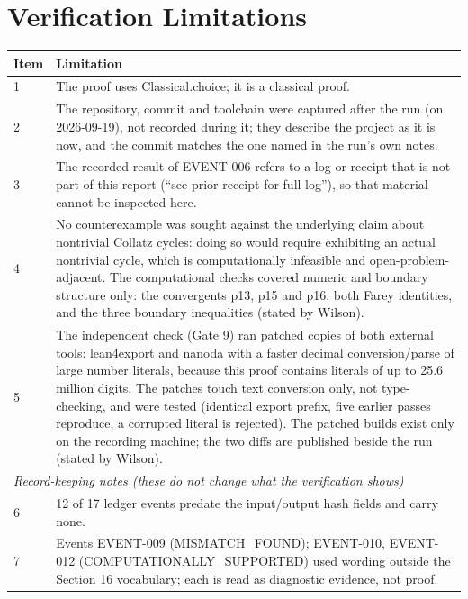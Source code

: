 \documentclass[11pt]{article}
\begin{document}
\section{Verification Limitations}
\begin{longtable}{p{}p{}}
\toprule Item & Limitation \\ \midrule \endhead
1 & The proof uses Classical.choice; it is a classical proof. \\
2 & The repository, commit and toolchain were captured after the run (on 2026-09-19), not recorded during it; they describe the project as it is now, and the commit matches the one named in the run's own notes. \\
3 & The recorded result of EVENT-006 refers to a log or receipt that is not part of this report (``see prior receipt for full log''), so that material cannot be inspected here. \\
4 & No counterexample was sought against the underlying claim about nontrivial Collatz cycles: doing so would require exhibiting an actual nontrivial cycle, which is computationally infeasible and open-problem-adjacent. The computational checks covered numeric and boundary structure only: the convergents p13, p15 and p16, both Farey identities, and the three boundary inequalities (stated by Wilson). \\
5 & The independent check (Gate 9) ran patched copies of both external tools: lean4export and nanoda with a faster decimal conversion/parse of large number literals, because this proof contains literals of up to 25.6 million digits. The patches touch text conversion only, not type-checking, and were tested (identical export prefix, five earlier passes reproduce, a corrupted literal is rejected). The patched builds exist only on the recording machine; the two diffs are published beside the run (stated by Wilson). \\
\midrule \multicolumn{2}{l}{\textit{Record-keeping notes (these do not change what the verification shows)}} \\ \midrule
6 & 12 of 17 ledger events predate the input/output hash fields and carry none. \\
7 & Events EVENT-009 (MISMATCH\_FOUND); EVENT-010, EVENT-012 (COMPUTATIONALLY\_SUPPORTED) used wording outside the Section 16 vocabulary; each is read as diagnostic evidence, not proof. \\
\bottomrule
\end{longtable}
\end{document}
